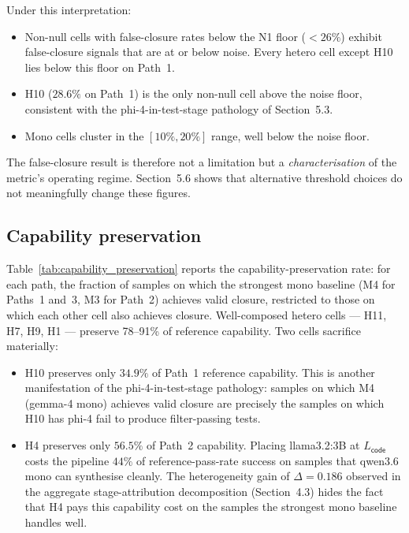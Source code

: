 Under this interpretation:

\begin{itemize}
  \item Non-null cells with false-closure rates below the N1 floor ($< 26\%$) exhibit false-closure signals that are at or below noise. Every hetero cell except H10 lies below this floor on Path~1.
  \item H10 ($28.6\%$ on Path~1) is the only non-null cell above the noise floor, consistent with the phi-4-in-test-stage pathology of Section~5.3.
  \item Mono cells cluster in the $[10\%, 20\%]$ range, well below the noise floor.
\end{itemize}

The false-closure result is therefore not a limitation but a \emph{characterisation} of the metric's operating regime. Section~5.6 shows that alternative threshold choices do not meaningfully change these figures.

\subsection{Capability preservation}



Table~\ref{tab:capability_preservation} reports the capability-preservation rate: for each path, the fraction of samples on which the strongest mono baseline (M4 for Paths~1 and~3, M3 for Path~2) achieves valid closure, restricted to those on which each other cell also achieves closure. Well-composed hetero cells --- H11, H7, H9, H1 --- preserve 78--91\% of reference capability. Two cells sacrifice materially:

\begin{itemize}
  \item H10 preserves only $34.9\%$ of Path~1 reference capability. This is another manifestation of the phi-4-in-test-stage pathology: samples on which M4 (gemma-4 mono) achieves valid closure are precisely the samples on which H10 has phi-4 fail to produce filter-passing tests.
  \item H4 preserves only $56.5\%$ of Path~2 capability. Placing llama3.2:3B at $L_{\textsf{code}}$ costs the pipeline $44\%$ of reference-pass-rate success on samples that qwen3.6 mono can synthesise cleanly. The heterogeneity gain of $\Delta = 0.186$ observed in the aggregate stage-attribution decomposition (Section~4.3) hides the fact that H4 pays this capability cost on the samples the strongest mono baseline handles well.
\end{itemize}

